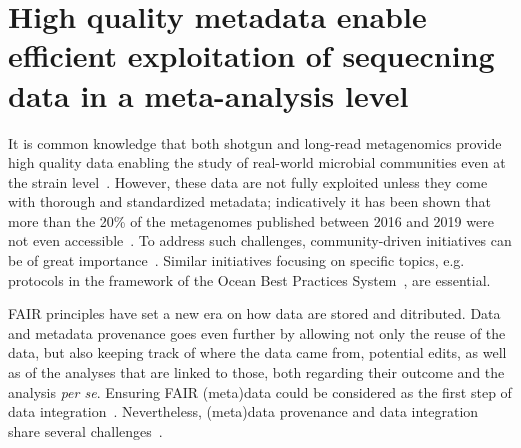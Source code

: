 \section{High quality metadata enable efficient exploitation of sequecning data in a meta-analysis level}
\label{concl:metadata}
   
      It is common knowledge that both shotgun and long-read metagenomics provide 
      high quality data enabling the study of real-world microbial communities even at the strain level~\citep{meyer2022critical}.
      However, these data are not fully exploited unless they come with thorough and standardized metadata;
      indicatively it has been shown that more than the 20\% of the metagenomes published between 2016 and 2019 
      were not even accessible~\citep{eckert2020every}.
      To address such challenges, community-driven initiatives can be of great importance~\citep{yilmaz2011minimum, 
      vangay2021microbiome, hu2022challenges}.
      Similar initiatives focusing on specific topics, e.g. protocols in the framework of the 
      Ocean Best Practices System~\citep{samuel2021towards}, are essential.

      FAIR principles have set a new era on how data are stored and ditributed. 
      Data and metadata provenance goes even further by allowing not only the reuse of the data, 
      but also keeping track of where the data came from, potential edits, 
      as well as of the analyses that are linked to those, both regarding their outcome and the analysis \textit{per se}. 
      Ensuring FAIR (meta)data could be considered as the first step of data integration~\citep{freire2008provenance, deelman2010metadata}.
      Nevertheless, (meta)data provenance and data integration share several challenges~\citep{cheney2009provenance}. 
   
